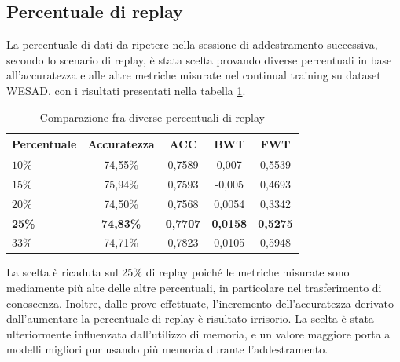 \subsection{Percentuale di replay}
La percentuale di dati da ripetere nella sessione di addestramento successiva, secondo lo scenario di replay, è stata scelta provando diverse percentuali in base all'accuratezza e alle altre metriche misurate nel continual training su dataset WESAD, con i risultati presentati nella tabella \ref{tab:replayperctest}.\\
\begin{table}[h]
    \begin{center}
        \begin{tabular}{l|c|c|c|c}
            \textbf{Percentuale} & \textbf{Accuratezza} & \textbf{ACC} & \textbf{BWT} & \textbf{FWT}\\
            \hline
            $10\%$ & 74,55\% & 0,7589 & 0,007 & 0,5539\\
            $15\%$ & 75,94\% & 0,7593 & -0,005 & 0,4693\\
            $20\%$ & 74,50\% & 0,7568 & 0,0054 & 0,3342\\
            \textbf{25\%} & \textbf{74,83\%} & \textbf{0,7707} & \textbf{0,0158} & \textbf{0,5275}\\
            $33\%$ & 74,71\% & 0,7823 & 0,0105 & 0,5948\\
        \end{tabular}
        \caption{Comparazione fra diverse percentuali di replay}
        \label{tab:replayperctest}
    \end{center}
\end{table}
La scelta è ricaduta sul 25\% di replay poiché le metriche misurate sono mediamente più alte delle altre percentuali, in particolare nel trasferimento di conoscenza. Inoltre, dalle prove effettuate, l'incremento dell'accuratezza derivato dall'aumentare la percentuale di replay è risultato irrisorio. La scelta è stata ulteriormente influenzata dall'utilizzo di memoria, e un valore maggiore porta a modelli migliori pur usando più memoria durante l'addestramento.
